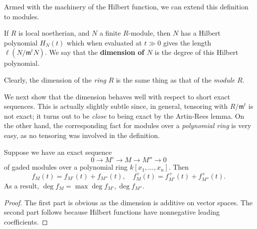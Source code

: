 Armed with the machinery of the Hilbert function, we can extend this
definition to modules.
\begin{definition} 
If $R$ is local noetherian, and $N$ a finite $R$-module, then $N$ has a
Hilbert polynomial $H_N(t)$ which when evaluated at $t \gg 0$ gives
the length $\ell(N/\mathfrak{m}^t N)$.
We say that the \textbf{dimension of
$N$} is the degree of this Hilbert polynomial.
\end{definition} 

Clearly, the dimension of the \emph{ring} $R$ is the same thing as that of the
\emph{module} $R$.

We next show that the dimension behaves well with respect to short exact
sequences. This is actually slightly subtle since, in general, tensoring with
$R/\mathfrak{m}^t$ is not exact; it turns out to be \emph{close} to being
exact by the Artin-Rees lemma. 
On the other hand, the corresponding fact for modules over a \emph{polynomial
ring} is very easy, as 
no tensoring was involved in the definition.

\begin{proposition} 
Suppose we have an exact sequence
\[ 0 \to M' \to M \to M'' \to 0 \]
of gaded modules over a polynomial ring $k[x_1, \dots, x_n]$.	Then
\[ f_M(t) = f_{M'}(t) + f_{M''}(t), \quad  f_M^+(t) = f_{M'}^+(t) +
f_{M''}^+(t). \]
As a result, $\deg f_M = \max \deg f_{M'}, \deg f_{M''}$.
\end{proposition} 
\begin{proof} The first part is obvious as the dimension is additive on vector
spaces. The second part follows because Hilbert functions have nonnegative
leading coefficients.
\end{proof} 

